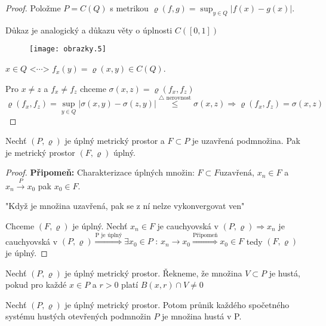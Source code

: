 \begin{proof}
Položme $P = C(Q)$ s metrikou $\varrho (f,g) = \sup_{y \in Q} | f(x)-g(x) |$. 

\begin{poznamka} 
Důkaz je analogický a důkazu věty o úplnosti $C([0,1])$
\end{poznamka}

\begin{figure}[!h] \begin{center}
\texttt{[image: obrazky.5]}
\end{center} \end{figure}

$x \in Q \textrm{ <$\cdots$> } f_x(y) = \varrho(x,y) \in C(Q)$. 

Pro $x \neq z$ a $f_x \neq f_z$ chceme $\sigma (x,z) = \varrho (f_x, f_z)$
$$\varrho (f_x, f_z) = \sup_{y \in Q} | \sigma (x,y) - \sigma (z,y) | \overset{\textrm{$\triangle$ nerovnost}}{\leq} \sigma (x,z) \Rightarrow \varrho (f_x, f_z) = \sigma(x,z)$$ 
\end{proof}


\begin{vetal}
Nechť $(P, \varrho)$ je úplný metrický prostor a $F \subset P$ je uzavřená podmnožina. Pak je metrický prostor $(F, \varrho)$ úplný.
\end{vetal}

\begin{proof}
\textbf{Připomeň: } Charakterizace úplných množin: $F \subset F \textrm{uzavřená}$, $x_n \in F$ a $x_n \overset{P}{\to} x_0$ pak $x_0 \in F$. 

"Když je množina uzavřená, pak se z ní nelze vykonvergovat ven"

Chceme $(F, \varrho)$ je úplný. Nechť $x_n \in F$ je cauchyovská v $(P, \varrho)\Rightarrow x_n$ je cauchyovská v $(P, \varrho) \overset{\textrm{P je úplný}}{\Rightarrow} \exists x_0 \in P \textrm{ : } x_n \to x_0 \overset{\textrm{Připomeň}}{\Rightarrow} x_0 \in F$ tedy $(F, \varrho)$ je úplný.
\end{proof}

\begin{definice}
Nechť $(P, \varrho)$ je úplný metrický prostor. Řekneme, že množina $V \subset P$ je hustá, pokud pro každé $x \in P$ a $r > 0$ platí $B(x,r) \cap V \neq 0$
\end{definice}

\begin{vetat}[Baire]
\label{Baire}
Nechť $(P, \varrho)$ je úplný metrický prostor. Potom průnik každého spočetného systému hustých otevřených podmnožin $P$ je množina hustá v P.
\end{vetat}

